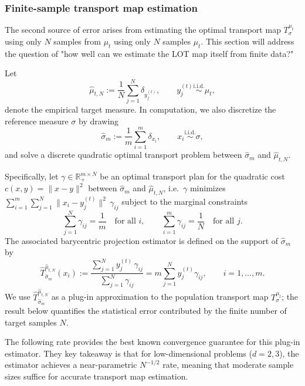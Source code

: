 \documentclass[11pt]{article}
\newcommand{\1}{\mathbf{1}}
\begin{document}
\subsubsection{Finite-sample transport map estimation}

The second source of error arises from estimating the optimal transport map $T_\sigma^{\mu_t}$ using only $N$ samples from $\mu_t$ using only $N$ samples $\mu_t$. This section will address the question of "how well can we estimate the LOT map itself from finite data?"

Let
\[
\hat{\mu}_{t,N} := \frac1N\sum_{j=1}^N \delta_{y_j^{(t)}},
\qquad y_j^{(t)} \stackrel{\mathrm{i.i.d.}}{\sim} \mu_t,
\]
denote the empirical target measure. In computation, we also discretize the reference measure $\sigma$ by drawing
\[
\hat{\sigma}_m := \frac1m\sum_{i=1}^m \delta_{x_i},
\qquad x_i \stackrel{\mathrm{i.i.d.}}{\sim} \sigma,
\]
and solve a discrete quadratic optimal transport problem between $\hat{\sigma}_m$ and $\hat{\mu}_{t,N}$.

Specifically, let $\gamma\in\mathbb R_+^{m\times N}$ be an optimal transport plan for the quadratic cost $c(x,y)=\|x-y\|^2$ between $\hat{\sigma}_m$ and $\hat{\mu}_{t,N}$, i.e.\ $\gamma$ minimizes
$\sum_{i=1}^m\sum_{j=1}^N \|x_i-y_j^{(t)}\|^2\,\gamma_{ij}$ subject to the marginal constraints
\[
\sum_{j=1}^N \gamma_{ij}=\frac1m
\quad\text{for all }i,
\qquad
\sum_{i=1}^m \gamma_{ij}=\frac1N
\quad\text{for all }j.
\]
The associated barycentric projection estimator is defined on the support of $\hat{\sigma}_m$ by
\begin{equation}\label{eq:bary-proj-emp}
  \hat{T}_{\hat{\sigma}_m}^{\hat{\mu}_{t,N}}(x_i)
  := \frac{\sum_{j=1}^{N} y_j^{(t)} \, \gamma_{ij}}
          {\sum_{j=1}^{N} \gamma_{ij}}
  = m\sum_{j=1}^N y_j^{(t)}\gamma_{ij},
  \qquad i=1,\dots,m.
\end{equation}
We use $\hat{T}_{\hat{\sigma}_m}^{\hat{\mu}_{t,N}}$ as a plug-in approximation to the population transport map $T_\sigma^{\mu_t}$; the result below quantifies the statistical error contributed by the finite number of target samples $N$. 

The following rate provides the best known convergence guarantee for this plug-in estimator. They key takeaway is that for low-dimensional problems ($d=2,3$), the estimator achieves a near-parametric $N^{-1/2}$ rate, meaning that moderate sample sizes suffice for accurate transport map estimation. \\ 
\end{document}
